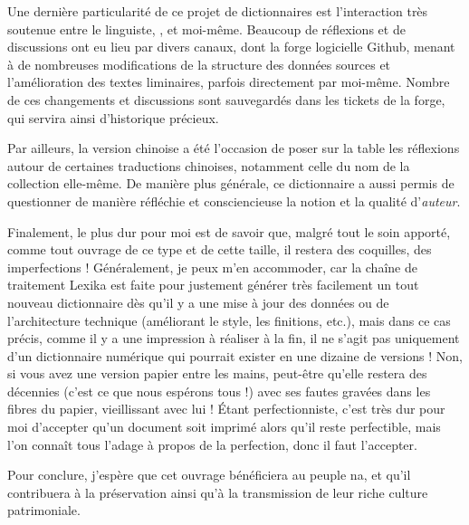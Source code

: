 Une dernière particularité de ce projet de dictionnaires est l’interaction très soutenue entre le linguiste, \alexisfra, et moi-même. Beaucoup de réflexions et de discussions ont eu lieu par divers canaux, dont la forge logicielle Github, menant à de nombreuses modifications de la structure des données sources et l’amélioration des textes liminaires, parfois directement par moi-même. Nombre de ces changements et discussions sont sauvegardés dans les tickets de la forge, qui servira ainsi d’historique précieux.

Par ailleurs, la version chinoise a été l’occasion de poser sur la table les réflexions autour de certaines traductions chinoises, notamment celle du nom de la collection elle-même. De manière plus générale, ce dictionnaire a aussi permis de questionner de manière réfléchie et consciencieuse la notion et la qualité d’\emph{auteur}.

Finalement, le plus dur pour moi est de savoir que, malgré tout le soin apporté, comme tout ouvrage de ce type et de cette taille, il restera des coquilles, des imperfections ! Généralement, je peux m’en accommoder, car la chaîne de traitement Lexika est faite pour justement générer très facilement un tout nouveau dictionnaire dès qu’il y a une mise à jour des données ou de l’architecture technique (améliorant le style, les finitions, etc.), mais dans ce cas précis, comme il y a une impression à réaliser à la fin, il ne s’agit pas uniquement d’un dictionnaire numérique qui pourrait exister en une dizaine de versions ! Non, si vous avez une version papier entre les mains, peut-être qu’elle restera des décennies (c’est ce que nous espérons tous !) avec ses fautes gravées dans les fibres du papier, vieillissant avec lui ! Étant perfectionniste, c’est très dur pour moi d’accepter qu’un document soit imprimé alors qu’il reste perfectible, mais l’on connaît tous l’adage à propos de la perfection, donc il faut l’accepter.

Pour conclure, j'espère que cet ouvrage bénéficiera au peuple na, et qu'il contribuera à la préservation ainsi qu'à la transmission de leur riche culture patrimoniale.

\bigskip

\hfill \benjaminfra
